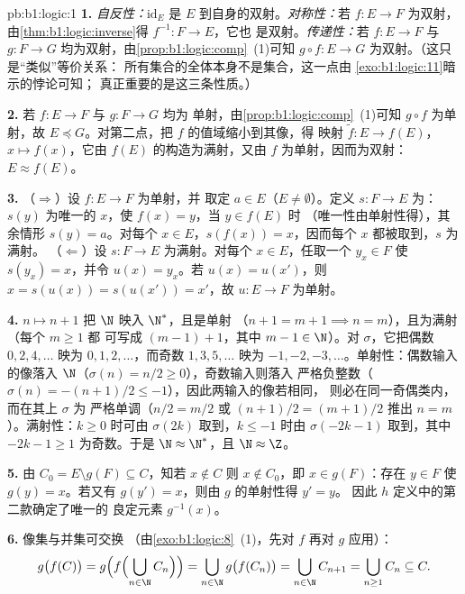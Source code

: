 \begin{solution}{pb:b1:logic:1}
\textbf{1.} \emph{自反性：}$\mathrm{id}_E$ 是 $E$
到自身的双射。\emph{对称性：}若 $f \colon E \to F$ 为双射，
由\cref{thm:b1:logic:inverse}得 $f^{-1} \colon F \to E$，它也
是双射。\emph{传递性：}若 $f \colon E \to F$ 与 $g \colon F
\to G$ 均为双射，由\cref{prop:b1:logic:comp}~(1)可知 $g \circ f
\colon E \to G$ 为双射。（这只是“类似”等价关系：
所有集合的全体本身不是集合，这一点由
\cref{exo:b1:logic:11}暗示的悖论可知；
真正重要的是这三条性质。）

\textbf{2.} 若 $f \colon E \to F$ 与 $g \colon F \to G$ 均为
单射，由\cref{prop:b1:logic:comp}~(1)可知 $g \circ f$ 为单射，故
$E \preceq G$。对第二点，把 $f$ 的值域缩小到其像，得
映射 $\tilde f \colon E \to f(E)$，$x \mapsto f(x)$，它由
$f(E)$ 的构造为满射，又由 $f$ 为单射，因而为双射：
$E \approx f(E)$。

\textbf{3.} （$\Rightarrow$）设 $f \colon E \to F$ 为单射，并
取定 $a \in E$（$E \neq \emptyset$）。定义 $s \colon F \to E$ 为：
$s(y)$ 为唯一的 $x$，使 $f(x) = y$，当 $y \in f(E)$ 时
（唯一性由单射性得），其余情形 $s(y) = a$。对每个 $x
\in E$，$s(f(x)) = x$，因而每个 $x$ 都被取到，$s$ 为满射。
（$\Leftarrow$）设 $s \colon F \to E$ 为满射。对每个 $x \in
E$，任取一个 $y_x \in F$ 使 $s(y_x) = x$，并令 $u(x) = y_x$。若
$u(x) = u(x')$，则 $x = s(u(x)) = s(u(x')) = x'$，故 $u \colon E \to F$
为单射。

\textbf{4.} $n \mapsto n + 1$ 把 $\N$ 映入 $\N^*$，且是单射
（$n + 1 = m + 1 \implies n = m$），且为满射（每个 $m \geq 1$ 都
可写成 $(m - 1) + 1$，其中 $m - 1 \in \N$）。对 $\sigma$，它把偶数
$0, 2, 4, \dots$ 映为 $0, 1, 2, \dots$，而奇数 $1, 3,
5, \dots$ 映为 $-1, -2, -3, \dots$。单射性：偶数输入的像落入
$\N$（$\sigma(n) = n/2 \geq 0$），奇数输入则落入
严格负整数（$\sigma(n) = -(n+1)/2 \leq -1$），因此两输入的像若相同，
则必在同一奇偶类内，而在其上 $\sigma$ 为
严格单调（$n/2 = m/2$ 或 $(n+1)/2 = (m+1)/2$ 推出 $n =
m$）。满射性：$k \geq 0$ 时可由 $\sigma(2k)$ 取到，$k \leq -1$ 时由
$\sigma(-2k - 1)$ 取到，其中 $-2k - 1 \geq 1$ 为奇数。于是 $\N \approx \N^*$，且
$\N \approx \Z$。

\textbf{5.} 由 $C_0 = E \setminus g(F) \subseteq C$，知若 $x \notin C$
则 $x \notin C_0$，即 $x \in g(F)$：存在 $y \in F$ 使
$g(y) = x$。若又有 $g(y') = x$，则由 $g$ 的单射性得 $y' = y$。
因此 $h$ 定义中的第二款确定了唯一的
良定元素 $g^{-1}(x)$。

\textbf{6.} 像集与并集可交换
（由\cref{exo:b1:logic:8}~(1)，先对 $f$ 再对 $g$ 应用）：
\[
g\bigl(f(C)\bigr)
= g\Bigl(f\Bigl(\bigcup_{n \in \N} C_n\Bigr)\Bigr)
= \bigcup_{n \in \N} g\bigl(f(C_n)\bigr)
= \bigcup_{n \in \N} C_{n+1}
= \bigcup_{n \geq 1} C_n \subseteq C .
\]


\end{solution}
